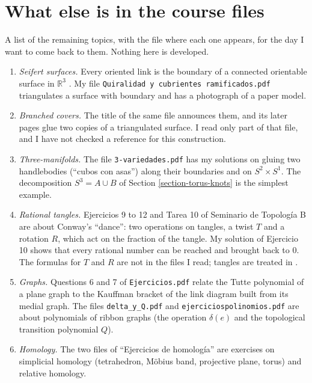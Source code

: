 \section{What else is in the course
files}
\label{section-course-files}

\noindent
A list of the remaining topics, with
the file where each one appears, for
the day I want to come back to them.
Nothing here is developed.
\begin{enumerate}
\item {\it Seifert surfaces.} Every
oriented link is the boundary of a
connected orientable surface in
$\mathbb{R}^3$
\cite[Theorem 5.1.1]{murasugi}. My file
{\tt Quiralidad y cubrientes
ramificados.pdf} triangulates a surface
with boundary and has a photograph of a
paper model.
\item {\it Branched covers.} The title
of the same file announces them, and
its later pages glue two copies of a
triangulated surface. I read only part
of that file, and I have not checked a
reference for this construction.
\item {\it Three-manifolds.} The file
{\tt 3-variedades.pdf} has my solutions
on gluing two handlebodies (``cubos con
asas'') along their boundaries and on
$S^2\times S^1$. The decomposition
$S^3=A\cup B$ of
Section \ref{section-torus-knots} is
the simplest example.
\item {\it Rational tangles.} Ejercicios
9 to 12 and Tarea 10 of Seminario de
Topolog\'ia B are about Conway's
``dance'': two operations on tangles,
a twist $T$ and a rotation $R$, which
act on the fraction of the tangle. My
solution of Ejercicio 10 shows that
every rational number can be reached
and brought back to $0$. The formulas
for $T$ and $R$ are not in the files I
read; tangles are treated in
\cite{murasugi}.
\item {\it Graphs.} Questions 6 and 7 of
{\tt Ejercicios.pdf} relate the Tutte
polynomial of a plane graph to the
Kauffman bracket of the link diagram
built from its medial graph. The files
{\tt delta\_y\_Q.pdf} and
{\tt ejerciciospolinomios.pdf} are
about polynomials of ribbon graphs (the
operation $\delta(e)$ and the
topological transition polynomial $Q$).
\item {\it Homology.} The two files of
``Ejercicios de homolog\'ia'' are
exercises on simplicial homology
(tetrahedron, M\"obius band, projective
plane, torus) and relative homology.
\end{enumerate}






